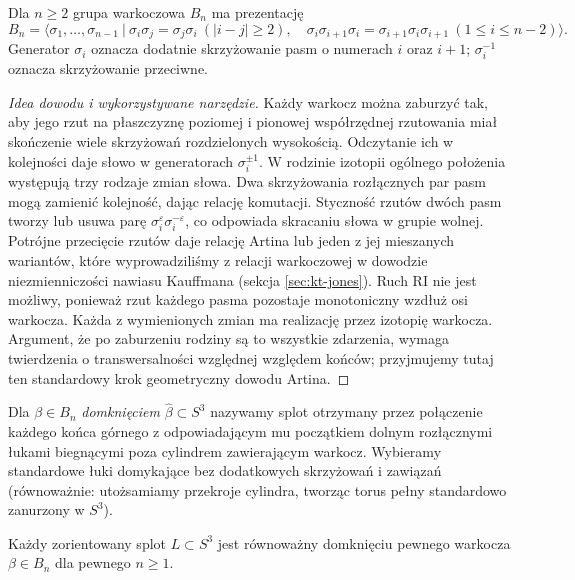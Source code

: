 \begin{twierdzenie}
Dla $n\geq2$ grupa warkoczowa $B_n$ ma prezentację
\[
B_n=\Big\langle\sigma_1,\ldots,\sigma_{n-1}\ \Big|\ 
\sigma_i\sigma_j=\sigma_j\sigma_i\ (|i-j|\geq2),\quad
\sigma_i\sigma_{i+1}\sigma_i=\sigma_{i+1}\sigma_i\sigma_{i+1}
\ (1\leq i\leq n-2)\Big\rangle.
\]
Generator $\sigma_i$ oznacza dodatnie skrzyżowanie pasm
o numerach $i$ oraz $i+1$; $\sigma_i^{-1}$ oznacza
skrzyżowanie przeciwne.
\end{twierdzenie}

\begin{proof}[Idea dowodu i wykorzystywane narzędzie]
Każdy warkocz można zaburzyć tak, aby jego rzut na płaszczyznę
poziomej i pionowej współrzędnej rzutowania miał skończenie wiele
skrzyżowań rozdzielonych wysokością. Odczytanie ich w kolejności
daje słowo w generatorach $\sigma_i^{\pm1}$.
W rodzinie izotopii ogólnego położenia występują trzy
rodzaje zmian słowa. Dwa skrzyżowania rozłącznych par
pasm mogą zamienić kolejność, dając relację komutacji.
Styczność rzutów dwóch pasm tworzy lub usuwa parę
$\sigma_i^\varepsilon\sigma_i^{-\varepsilon}$,
co odpowiada skracaniu słowa w grupie wolnej.
Potrójne przecięcie rzutów daje relację Artina lub
jeden z jej mieszanych wariantów, które wyprowadziliśmy
z relacji warkoczowej w dowodzie niezmienniczości nawiasu
Kauffmana (sekcja \ref{sec:kt-jones}).
Ruch $\mathrm{R I}$ nie jest możliwy, ponieważ rzut
każdego pasma pozostaje monotoniczny wzdłuż osi warkocza.
Każda z wymienionych zmian ma realizację przez izotopię
warkocza. Argument, że po zaburzeniu rodziny są to
wszystkie zdarzenia, wymaga twierdzenia o transwersalności
względnej względem końców; przyjmujemy tutaj ten
standardowy krok geometryczny dowodu Artina.
\end{proof}

\begin{definicja}
Dla $\beta\in B_n$ \emph{domknięciem} $\widehat\beta\subset S^3$
nazywamy splot otrzymany przez połączenie każdego końca
górnego z odpowiadającym mu początkiem dolnym rozłącznymi
łukami biegnącymi poza cylindrem zawierającym warkocz.
Wybieramy standardowe łuki domykające bez dodatkowych
skrzyżowań i zawiązań (równoważnie: utożsamiamy przekroje
cylindra, tworząc torus pełny standardowo zanurzony w $S^3$).
\end{definicja}

\begin{twierdzenie}[Alexander]
Każdy zorientowany splot $L\subset S^3$ jest równoważny
domknięciu pewnego warkocza $\beta\in B_n$ dla pewnego $n\geq1$.
\end{twierdzenie}


